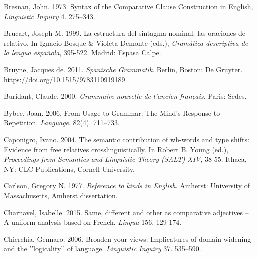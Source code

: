 \begin{styleStandard}
Bresnan, John. 1973. Syntax of the Comparative Clause Construction in English, \textit{Linguistic Inquiry} 4. 275–343.
\end{styleStandard}

\begin{styleStandard}
Brucart, Joseph M. 1999. La estructura del sintagma nominal: las oraciones de relativo. In Ignacio Bosque \& Violeta Demonte (eds.), \textit{Gramática descriptiva de la lengua española}, 395-522. Madrid: Espasa Calpe.
\end{styleStandard}

\begin{styleStandard}
Bruyne, Jacques de. 2011. \textit{Spanische Grammatik}. Berlin, Boston: De Gruyter. https://doi.org/10.1515/9783110919189
\end{styleStandard}

\begin{styleStandard}
Buridant, Claude. 2000. \textit{Grammaire nouvelle de l'ancien français. }Paris: Sedes. 
\end{styleStandard}

\begin{styleStandard}
Bybee, Joan. 2006. From Usage to Grammar: The Mind’s Response to Repetition. \textit{Language}. 82(4). 711–733.
\end{styleStandard}

\begin{styleStandard}
Caponigro, Ivano. 2004. The semantic contribution of wh-words and type shifts: Evidence from free relatives crosslinguistically. In Robert B. Young (ed.), \textit{Proceedings from Semantics and Linguistic Theory (SALT)} \textit{XIV}, 38-55. Ithaca, NY: CLC Publications, Cornell University.
\end{styleStandard}

\begin{styleStandard}
Carlson, Gregory N. 1977. \textit{Reference to kinds in English}. Amherst: University of Massachusetts, Amherst dissertation.
\end{styleStandard}

\begin{styleStandard}
Charnavel, Isabelle. 2015. Same, different and other as comparative adjectives – A uniform analysis based on French. \textit{Lingua} 156. 129-174.
\end{styleStandard}

\begin{styleStandard}
Chierchia, Gennaro. 2006. Broaden your views: Implicatures of domain widening and the '{}'logicality'{}' of language. \textit{Linguistic Inquiry} 37. 535–590.
\end{styleStandard}


